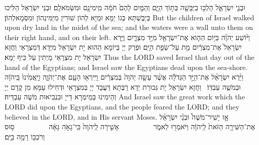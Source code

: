 {{וּבְנֵ֧י יִשְׂרָאֵ֛ל הָלְכ֥וּ בַיַּבָּשָׁ֖ה בְּת֣וֹךְ הַיָּ֑ם וְהַמַּ֤יִם לָהֶם֙ חֹמָ֔ה מִֽימִינָ֖ם וּמִשְּׂמֹאלָֽם׃}
{וּבְנֵי יִשְׂרָאֵל הַלִּיכוּ בְּיַבֶּשְׁתָּא בְּגוֹ יַמָּא וּמַיָּא לְהוֹן שׁוּרִין מִיַּמִּינְהוֹן וּמִסְּמָאלְהוֹן׃}
{But the children of Israel walked upon dry land in the midst of the sea; and the waters were a wall unto them on their right hand, and on their left.}{}
{וַיּ֨וֹשַׁע יְהֹוָ֜ה בַּיּ֥וֹם הַה֛וּא אֶת־יִשְׂרָאֵ֖ל מִיַּ֣ד מִצְרָ֑יִם וַיַּ֤רְא יִשְׂרָאֵל֙ אֶת־מִצְרַ֔יִם מֵ֖ת עַל־שְׂפַ֥ת הַיָּֽם׃
}
{וּפְרַק יְיָ בְּיוֹמָא הַהוּא יָת יִשְׂרָאֵל מִיְּדָא דְּמִצְרָאֵי וַחֲזָא יִשְׂרָאֵל יָת מִצְרָאֵי מָיְתִין עַל כֵּיף יַמָּא׃}
{Thus the LORD saved Israel that day out of the hand of the Egyptians; and Israel saw the Egyptians dead upon the sea-shore.}{}
{וַיַּ֨רְא יִשְׂרָאֵ֜ל אֶת־הַיָּ֣ד הַגְּדֹלָ֗ה אֲשֶׁ֨ר עָשָׂ֤ה יְהֹוָה֙ בְּמִצְרַ֔יִם וַיִּֽירְא֥וּ הָעָ֖ם אֶת־יְהֹוָ֑ה וַיַּֽאֲמִ֙ינוּ֙ בַּֽיהֹוָ֔ה וּבְמֹשֶׁ֖ה עַבְדּֽוֹ׃ \petucha 
{}}
{וַחֲזָא יִשְׂרָאֵל יָת גְּבוּרַת יְדָא רַבְּתָא דַּעֲבַד יְיָ בְּמִצְרָאֵי וּדְחִילוּ עַמָּא מִן קֳדָם יְיָ וְהֵימִינוּ בְּמֵימְרָא דַּייָ וּבִנְבִיאוּת מֹשֶׁה עַבְדֵּיהּ׃}
{And Israel saw the great work which the LORD did upon the Egyptians, and the people feared the LORD; and they believed in the LORD, and in His servant Moses.}{}
\newperek
{}%
{אָ֣ז יָשִֽׁיר־מֹשֶׁה֩ וּבְנֵ֨י יִשְׂרָאֵ֜ל אֶת־הַשִּׁירָ֤ה הַזֹּאת֙ לַֽיהֹוָ֔ה וַיֹּאמְר֖וּ לֵאמֹ֑ר \setuma          אָשִׁ֤ירָה לַֽיהֹוָה֙ כִּֽי־גָאֹ֣ה גָּאָ֔ה \setuma          ס֥וּס וְרֹכְב֖וֹ רָמָ֥ה בַיָּֽם׃ \setuma         
}}
